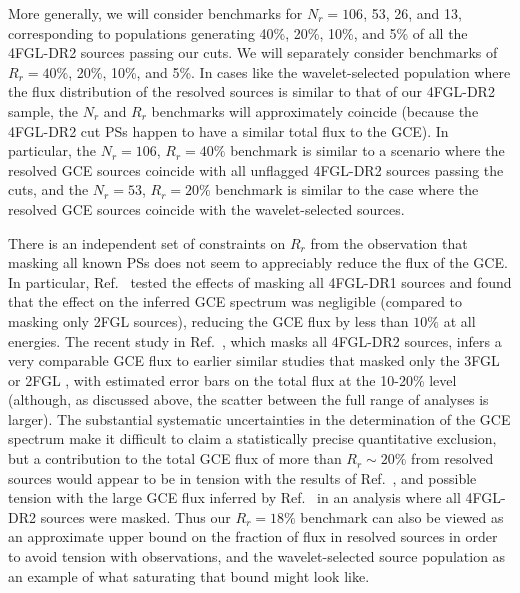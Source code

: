 \documentclass[letter,11pt]{article}
\begin{document}
More generally, we will consider benchmarks for $N_r = 106$, 53, 26, and 13, corresponding to populations generating 40\%, 20\%, 10\%, and 5\% of all the 4FGL-DR2 sources passing our cuts. We will separately consider benchmarks of $R_r=40\%$, 20\%, 10\%, and 5\%. In cases like the wavelet-selected population where the flux distribution of the resolved sources is similar to that of our 4FGL-DR2 sample, the $N_r$ and $R_r$ benchmarks will approximately coincide (because the 4FGL-DR2 cut PSs happen to have a similar total flux to the GCE). In particular, the $N_r=106$, $R_r=40\%$ benchmark is similar to a scenario where the resolved GCE sources coincide with all unflagged 4FGL-DR2 sources passing the cuts, and the $N_r=53$, $R_r=20\%$ benchmark is similar to the case where the resolved GCE sources coincide with the wavelet-selected sources.

There is an independent set of constraints on $R_r$ from the observation that masking all known PSs does not seem to appreciably reduce the flux of the GCE. In particular, Ref.~\cite{Zhong:2019ycb} tested the effects of masking all 4FGL-DR1 sources and found that the effect on the inferred GCE spectrum was negligible (compared to masking only 2FGL sources), reducing the GCE flux by less than $10\%$ at all energies. The recent study in Ref.~\cite{DiMauro:2021raz}, which masks all 4FGL-DR2 sources, infers a very comparable GCE flux to earlier similar studies that masked only the 3FGL \cite{Ajello:2017opo} or 2FGL \cite{Calore:2014xka}, with estimated error bars on the total flux at the 10-20\% level (although, as discussed above, the scatter between the full range of analyses is larger). The substantial systematic uncertainties in the determination of the GCE spectrum make it difficult to claim a statistically precise quantitative exclusion, but a contribution to the total GCE flux of more than $R_r\sim 20\%$ from resolved sources would appear to be in tension with the results of Ref.~\cite{Zhong:2019ycb}, and possible tension with the large GCE flux inferred by Ref.~\cite{DiMauro:2021raz} in an analysis where all 4FGL-DR2 sources were masked. Thus our $R_r=18\%$ benchmark can also be viewed as an approximate upper bound on the fraction of flux in resolved sources in order to avoid tension with observations, and the wavelet-selected source population as an example of what saturating that bound might look like.
\end{document}
